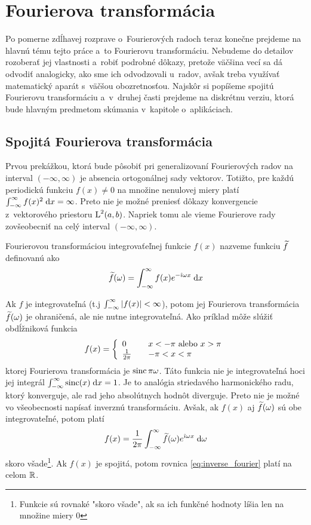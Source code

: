 \section{Fourierova transformácia}
Po pomerne zdĺhavej rozprave o~Fourierových radoch teraz konečne
prejdeme na hlavnú tému tejto práce a~to Fourierovu transformáciu.
Nebudeme do detailov rozoberať jej vlastnosti a~robiť podrobné dôkazy,
pretože väčšina vecí sa dá odvodiť analogicky, ako sme ich odvodzovali
u~radov, avšak treba využívať matematický aparát s~väčšou
obozretnosťou. Najskôr si popíšeme spojitú Fourierovu transformáciu 
a~v~druhej časti prejdeme na diskrétnu verziu, ktorá bude hlavným
predmetom skúmania v~kapitole o~aplikáciach.

\subsection{Spojitá Fourierova transformácia}
Prvou prekážkou, ktorá bude pôsobiť pri generalizovaní Fourierových
radov na interval $(-\infty,\infty)$ je absencia ortogonálnej sady
vektorov. Totižto, pre každú periodickú funkciu $f(x)\not=0$ na
množine nenulovej miery platí $\int_{-\infty}^{\infty} f(x)^2 \; \mathrm{d} x = \infty$.
Preto nie je možné preniesť dôkazy konvergencie z~vektorového
priestoru $\mbox{L}^2(a,b)$. Napriek tomu ale vieme Fourierove rady zovšeobecniť
na celý interval $(-\infty,\infty)$.
\begin{definicia}
    Fourierovou transformáciou integrovaťeľnej funkcie $f(x)$ nazveme
    funkciu $\widetilde{f}$ definovanú ako
    \begin{equation*}
        \widetilde{f}(\omega) = \int_{-\infty}^{\infty} f(x) e^{-\hat{\imath} \omega x} \; \mathrm{d} x
    \end{equation*}
    \label{def:fourier_transform}
\end{definicia}
Ak $f$ je integrovateľná (t.j $\int_{-\infty}^{\infty} |f(x)| < \infty$), potom jej
Fourierova transformácia $\widetilde{f}(\omega)$ je ohraničená, ale nie nutne
integrovateľná. Ako príklad môže slúžiť obdĺžniková funkcia 
\begin{equation*}
    f(x) = \left\{  \begin{array}{l l}
                        0 \quad&x <-\pi \text{ alebo } x>\pi \\
                        \frac{1}{2\pi}\quad& -\pi<x<\pi
                    \end{array}
            \right.
\end{equation*}
ktorej Fourierova transformácia je $\operatorname{sinc}{\pi \omega}$. Táto funkcia
nie je integrovateľná hoci jej integrál $\int_{-\infty}^{\infty} \operatorname{sinc}(x) \; \mathrm{d} x = 1$.
Je to analógia striedavého harmonického radu, ktorý konverguje, ale
rad jeho absolútnych hodnôt diverguje.
Preto nie je možné vo všeobecnosti napísať inverznú transformáciu.
Avšak, ak $f(x)$ aj $\widetilde{f}(\omega)$ sú obe integrovateľné, potom platí
\begin{equation}
    f(x) = \frac{1}{2\pi} \int_{-\infty}^{\infty} 
        \widetilde{f}(\omega) e^{\hat{\imath} \omega x} \; \mathrm{d} \omega
    \label{eq:inverse_fourier}
\end{equation}
skoro všade\footnote{Funkcie sú rovnaké "skoro všade", ak sa ich
funkčné hodnoty líšia
len na množine miery 0}. Ak $f(x)$ je spojitá, potom rovnica
\eqref{eq:inverse_fourier} platí na celom ${\mathbb R}$.

